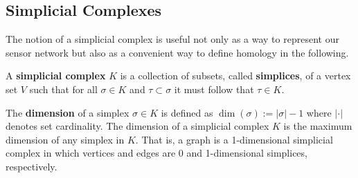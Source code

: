 
\subsection{Simplicial Complexes}\label{sec:complexes}

The notion of a simplicial complex is useful not only as a way to represent our sensor network but also as a convenient way to define homology in the following.
\begin{definition}
   A \textbf{simplicial complex} $K$ is a collection of subsets, called \textbf{simplices}, of a vertex set $V$ such that for all $\sigma\in K$ and $\tau\subset\sigma$ it must follow that $\tau\in K$.
\end{definition}
The \textbf{dimension} of a simplex $\sigma\in K$ is defined as $\dim(\sigma) := |\sigma|-1$ where $|\cdot|$ denotes set cardinality.
The dimension of a simplicial complex $K$ is the maximum dimension of any simplex in $K$.
That is, a graph is a 1-dimensional simplicial complex in which vertices and edges are 0 and 1-dimensional simplices, respectively.

